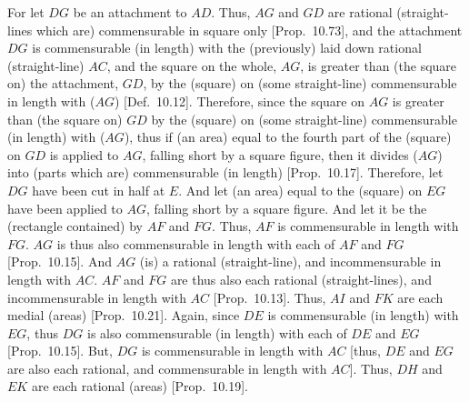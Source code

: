 For let $DG$ be an attachment to $AD$. Thus, $AG$ and $GD$
are rational (straight-lines which are) commensurable in square only [Prop.~10.73],
and the attachment $DG$ is commensurable (in length) with the
(previously) laid down rational (straight-line) $AC$, and the square on
the whole, $AG$, is greater than (the square on) the attachment, $GD$,
by the (square) on (some straight-line) commensurable in length with ($AG$) 
[Def.~10.12]. Therefore, since the square on $AG$ is
greater than (the square on) $GD$ by the (square) on (some
straight-line) commensurable (in length) with ($AG$), thus if  (an area)
equal to the fourth part of the (square) on $GD$ is applied
to $AG$, falling short by a square figure, then it divides ($AG$) into (parts which
are) commensurable (in length) [Prop.~10.17]. 
Therefore, let $DG$ have been cut in half at $E$. And let (an area) equal to
the (square) on $EG$ have been applied to $AG$, falling short
by a square figure. And let it be the (rectangle contained) by $AF$ and $FG$.
Thus, $AF$ is commensurable in length with $FG$. $AG$ is thus
also commensurable in length with each of $AF$ and $FG$ [Prop.~10.15]. And $AG$ (is) a rational (straight-line), and incommensurable in length with $AC$. $AF$ and $FG$
are thus also each rational (straight-lines), and incommensurable in length with
$AC$ [Prop.~10.13].
Thus, $AI$
and $FK$ are each medial (areas) [Prop.~10.21]. 
Again, since $DE$ is commensurable (in length) with $EG$, thus
$DG$ is also commensurable (in length) with each of $DE$ and $EG$ [Prop.~10.15]. But, $DG$ is commensurable
in length with $AC$ [thus, $DE$ and $EG$ are also each rational, and
commensurable in length with $AC$]. Thus, $DH$ and $EK$ are each
rational (areas) [Prop.~10.19].

